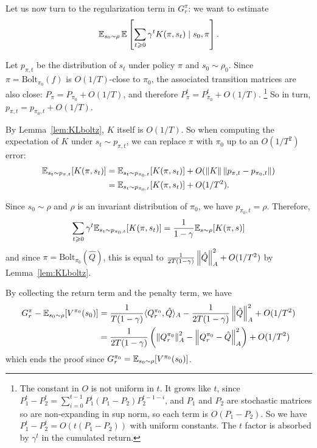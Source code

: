 \documentclass[11pt,a4paper]{article}
\newcommand{\Bol}{\mathrm{Bolt}_{\pi_0}}
\begin{document}
\begin{dem}
Let us now turn to the regularization term in $G^{\pi}_r$: we want to estimate
\begin{equation}
\mathbb{E}_{s_0\sim \rho} \,\mathbb{E}\left[
\sum_{t \geqslant 0} \gamma^t K(\pi,s_t)\mid s_0,\pi
\right].
\end{equation}

Let $p_{\pi,t}$ be the distribution of $s_t$ under policy $\pi$ and
$s_0\sim \rho_0$. Since $\pi=\Bol(f)$ is $O(1/T)$-close to $\pi_0$, the
associated 
transition matrices are also close: $P_{\pi}=P_{\pi_0}+O(1/T)$, and
therefore $P_\pi^t=P_{\pi_0}^t+O(1/T)$.
\footnote{The constant in $O$ is
not uniform in $t$. It grows like $t$, since
$P_1^t-P_2^t=\sum_{i=0}^{t-1} P_1^i
(P_1-P_2) P_2^{t-1-i}$, and $P_1$ and $P_2$ are stochastic matrices so are
non-expanding in sup norm, so each term is $O(P_1-P_2)$. So we have $P_1^t-P_2^t= O(t(P_1-P_2))$ with
uniform constants. The $t$ factor is absorbed by $\gamma^t$ in the
cumulated return.}
So in turn, $p_{\pi,t}=p_{\pi_0,t}+O(1/T)$.

By Lemma~\ref{lem:KLboltz}, $K$ itself is $O(1/T)$. So when computing the
expectation of $K$ under $s_t\sim p_{\pi,t}$, we can replace $\pi$ with
$\pi_0$ up to an $O(1/T^2)$ error:
\begin{align}
\mathbb{E}_{s_t\sim p_{\pi,t}} [K(\pi,s_t)]&=
\mathbb{E}_{s_t\sim p_{\pi_0,t}}
[K(\pi,s_t)]+O(\left\lVert K\right\rVert\left\lVert p_{\pi,t}-p_{\pi_0,t}\right\rVert)
\\&=
\mathbb{E}_{s_t\sim p_{\pi_0,t}} [K(\pi,s_t)]+O(1/T^2).
\end{align}

Since $s_0\sim \rho$ and $\rho$ is an invariant distribution of $\pi_0$,
we have $p_{\pi_0,t}=\rho$. Therefore,
\begin{equation}
\sum_{t\geqslant 0} \gamma^t \mathbb{E}_{s_t\sim p_{\pi_0,t}}
[K(\pi,s_t)]=\frac{1}{1-\gamma}\mathbb{E}_{s\sim \rho} [K(\pi,s)]
\end{equation}
and since $\pi=\Bol(\hat Q)$, 
this is equal to 
$\frac1{2T(1-\gamma)} \left\lVert\hat Q\right\rVert^2_A+O(1/T^2)$ by Lemma~\ref{lem:KLboltz}.

By collecting the return term and the penalty term, we have
\begin{align}
G^{\pi}_r-\mathbb{E}_{s_0\sim \rho}[V^{\pi_0}(s_0)]&=
\frac{1}{T(1-\gamma)}\langle Q_r^{\pi_0},\hat Q\rangle_A 
- \frac1{2T(1-\gamma)} \left\lVert\hat Q\right\rVert^2_A+O(1/T^2)
\\&=
\frac{1}{2T(1-\gamma)}\left(
\left\lVert Q_r^{\pi_0}\right\rVert^2_A-\left\lVert Q_r^{\pi_0}-\hat Q\right\rVert^2_A
\right)
+O(1/T^2)
\end{align}
which ends the proof since $G^{\pi_0}_r=\mathbb{E}_{s_0\sim
\rho}[V^{\pi_0}(s_0)]$.
\end{dem}
\end{document}
